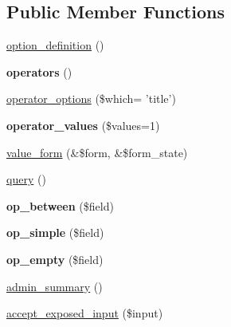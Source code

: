 \subsection*{Public Member Functions}
\begin{CompactItemize}
\item 
\hyperlink{classviews__handler__filter__numeric_a6c2de73a4c7eda8575e1691b8218b3b}{option\_\-definition} ()
\item 
\hypertarget{classviews__handler__filter__numeric_dcdd72328ca5fa645ac82b30e8eaad54}{
\textbf{operators} ()}
\label{classviews__handler__filter__numeric_dcdd72328ca5fa645ac82b30e8eaad54}

\item 
\hyperlink{classviews__handler__filter__numeric_55335fe026be2bd630638382050626e6}{operator\_\-options} (\$which= 'title')
\item 
\hypertarget{classviews__handler__filter__numeric_13018d564ca15254822b6381eaddff71}{
\textbf{operator\_\-values} (\$values=1)}
\label{classviews__handler__filter__numeric_13018d564ca15254822b6381eaddff71}

\item 
\hyperlink{classviews__handler__filter__numeric_b0888218590f7c620f10fc04a98d135e}{value\_\-form} (\&\$form, \&\$form\_\-state)
\item 
\hyperlink{classviews__handler__filter__numeric_aa5c6b227651bd1676850f5999f2a897}{query} ()
\item 
\hypertarget{classviews__handler__filter__numeric_65445ba78ee73a2e64311af7888fb850}{
\textbf{op\_\-between} (\$field)}
\label{classviews__handler__filter__numeric_65445ba78ee73a2e64311af7888fb850}

\item 
\hypertarget{classviews__handler__filter__numeric_ca9524bdd6d534b8c4fcbcf019662641}{
\textbf{op\_\-simple} (\$field)}
\label{classviews__handler__filter__numeric_ca9524bdd6d534b8c4fcbcf019662641}

\item 
\hypertarget{classviews__handler__filter__numeric_12e3f374a810ce5dbb586ec0bcb83e0d}{
\textbf{op\_\-empty} (\$field)}
\label{classviews__handler__filter__numeric_12e3f374a810ce5dbb586ec0bcb83e0d}

\item 
\hyperlink{classviews__handler__filter__numeric_aece85d3c36d4186c871cc55e636f4f2}{admin\_\-summary} ()
\item 
\hyperlink{classviews__handler__filter__numeric_0fd6abb3062be32410bef3c1cefdaaf5}{accept\_\-exposed\_\-input} (\$input)
\end{CompactItemize}
